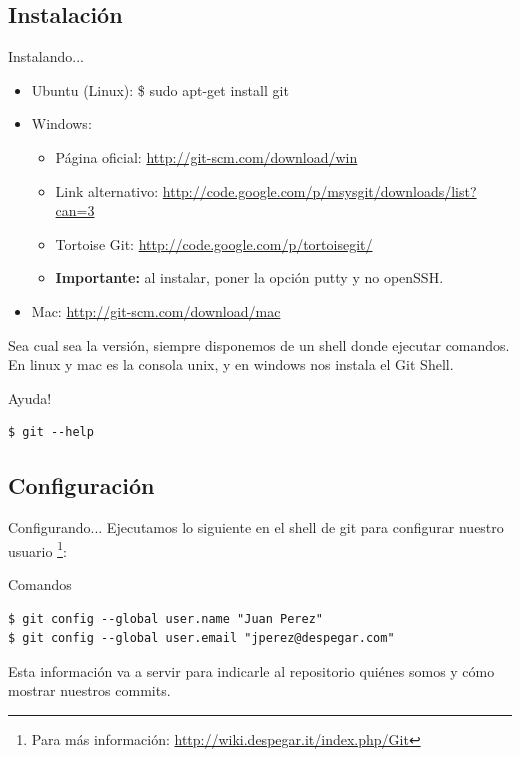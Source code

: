 \documentclass{beamer}
\begin{document}
\subsection{Instalación}
\begin{frame}[fragile]{Instalando...} 
  \begin{block}{}
      \begin{itemize}
      \item Ubuntu (Linux): \$ sudo apt-get install git \pause
	\item	 Windows: \begin{itemize}
			\item Página oficial: \url{http://git-scm.com/download/win} 
			\item Link alternativo: \url{http://code.google.com/p/msysgit/downloads/list?can=3}
			\item Tortoise Git: \url{http://code.google.com/p/tortoisegit/}
			\item \textbf{Importante:} al instalar, poner la opción putty y no openSSH.
		      \end{itemize} \pause
      \item Mac: \url{http://git-scm.com/download/mac} \pause
      \end{itemize}
  
    Sea cual sea la versión, siempre disponemos de un shell donde ejecutar comandos. En linux y mac es la consola unix,
    y en windows nos instala el Git Shell.
  \end{block}
  \pause
  \begin{block}{Ayuda!}
    \begin{verbatim}
$ git --help
     \end{verbatim}
  \end{block}
  
\end{frame}
\subsection{Configuración}
\begin{frame}[fragile]{Configurando...}
  Ejecutamos lo siguiente en el shell de git para configurar nuestro usuario \footnote{Para más información: \url{http://wiki.despegar.it/index.php/Git}}:
  
  \begin{block}{Comandos}
  \begin{verbatim}
$ git config --global user.name "Juan Perez"
$ git config --global user.email "jperez@despegar.com"
  \end{verbatim}
  \end{block}

  Esta información va a servir para indicarle al repositorio quiénes somos y cómo mostrar nuestros commits.
  
\end{frame}
\end{document}
